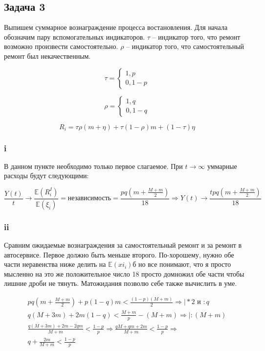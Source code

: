 \documentclass[a4paper,12pt]{article}
\def \mbb{\mathbb}
\def \E{\mbb{E}}
\begin{document}
\subsection{Задача 3}

Выпишем суммарное вознаграждение процесса востановления. Для начала обозначим пару вспомогательных индикаторов. $ \tau $ -- индикатор того, что ремонт возможно произвести самостоятельно. $ \rho $ -- индикатор того, что самостоятельный ремонт был некачественным. \

\[\tau = \begin{cases}
1,  p\\
0, 1-p
\end{cases}  \]

\[\rho = \begin{cases}
1,  q\\
0, 1-q
\end{cases}  \]

\[ R_i = \tau \rho (m + \eta) + \tau (1-\rho)m + (1 - \tau) \eta \]


\subsubsection{i}

В данном пункте необходимо только первое слагаемое. При $  t \to \infty $ уммарные расходы будут следующими:

\[ \frac{Y(t)}{t} \to \frac{\E(R_i^I)}{\E(\xi_i)} = \text{независимость} = \frac{pq\left(m + \frac{M + m}{2}\right)}{18} \Rightarrow Y(t) \to \frac{tpq\left(m + \frac{M + m}{2}\right)}{18}  \]

\subsubsection{ii}

Сравним ожидаемые вознаграждения за самостоятельный ремонт и за ремонт в автосервисе. Первое должно быть меньше второго. По-хорошему, нужно обе части неравенства ниже делить на $ \E(xi_i) $б но все понимают, что я просто мысленно на это же положительное число 18 просто домножил обе части чтобы лишние дроби не тянуть. Матожидания позволю себе также вычислить в уме.

\begin{equation}
\begin{aligned}
pq\left(m + \frac{M + m}{2}\right) + p(1-q)m < \frac{(1-p)(M+m)}{2} \Rightarrow \Big| *2 \text{ и } :q\\
q(M + 3m) + 2m(1-q) < \frac{M+m}{p} - (M + m) \Rightarrow \Big| :(M+m) \\
\frac{q(M + 3m) + 2m - 2qm}{M+m} < \frac{1 - p}{p} \Rightarrow
\frac{qM + qm + 2m}{M + m} < \frac{1 - p}{p} \Rightarrow \\
q + \frac{2m}{M + m} < \frac{1 - p}{p} 
\end{aligned}
\end{equation}
\end{document}
